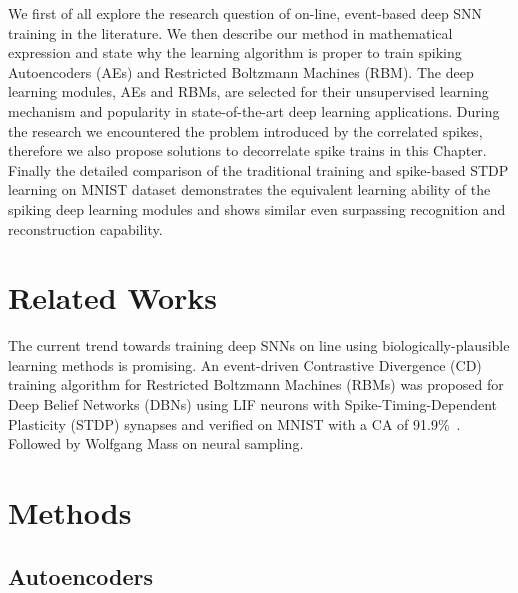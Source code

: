 We first of all explore the research question of on-line, event-based deep SNN training in the literature.
We then describe our method in mathematical expression and state why the learning algorithm is proper to train spiking Autoencoders (AEs) and Restricted Boltzmann Machines (RBM).
The deep learning modules, AEs and RBMs, are selected for their unsupervised learning mechanism and popularity in state-of-the-art deep learning applications.
During the research we encountered the problem introduced by the correlated spikes, therefore we also propose solutions to decorrelate spike trains in this Chapter. 
Finally the detailed comparison of the traditional training and spike-based STDP learning on MNIST dataset demonstrates the equivalent learning ability of the spiking deep learning modules and shows similar even surpassing recognition and reconstruction capability.


\section{Related Works}
The current trend towards training deep SNNs on line using biologically-plausible learning methods is promising.
An event-driven Contrastive Divergence (CD) training algorithm for Restricted Boltzmann Machines (RBMs) was proposed for Deep Belief Networks (DBNs) using LIF neurons with Spike-Timing-Dependent Plasticity (STDP) synapses and verified on MNIST with a CA of 91.9\%~\cite{neftci2013event}.
Followed by Wolfgang Mass on neural sampling.


\section{Methods}
\subsection{Autoencoders}

